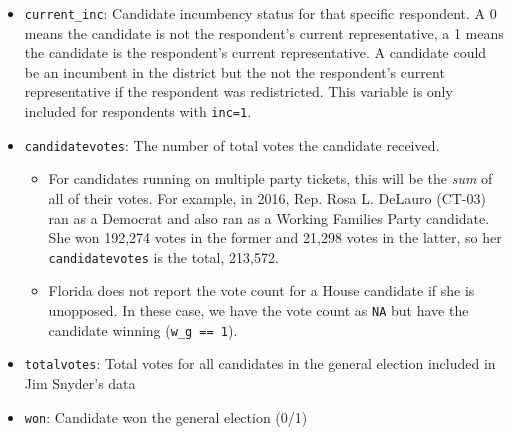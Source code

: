 \documentclass[12pt]{article}
\newcommand{\skcomment}[1]{\textcolor{blue}{\textbf{SK: #1}}}
\begin{document}
\begin{itemize}[leftmargin=*]
\item \texttt{current\_inc}: Candidate incumbency status for that specific respondent. A 0 means the candidate is not the respondent's current representative, a 1 means the candidate is the respondent's current representative. A candidate could be an incumbent in the district but the not the respondent's current representative if the respondent was redistricted. This variable is only included for respondents with \texttt{inc=1}.

			
			
\item \texttt{candidatevotes}: The number of total votes the candidate received. 
\begin{itemize}
\item For candidates running on multiple party tickets, this will be the \emph{sum} of all of their votes.  For example, in 2016, Rep. Rosa L. DeLauro (CT-03) ran as a Democrat and also ran as a Working Families Party candidate. She won 192,274 votes in the former and 21,298 votes in the latter, so her \texttt{candidatevotes} is the total, 213,572.
\item  Florida does not report the vote count for a House candidate if she is unopposed. In these case, we have the vote count as \texttt{NA} but have the candidate winning (\texttt{w\_g == 1}).
\end{itemize}
				

\item \texttt{totalvotes}: Total votes for all candidates in the general election included in Jim Snyder's data

\item \texttt{won}: Candidate won the general election (0/1)



\end{itemize}
\end{document}
